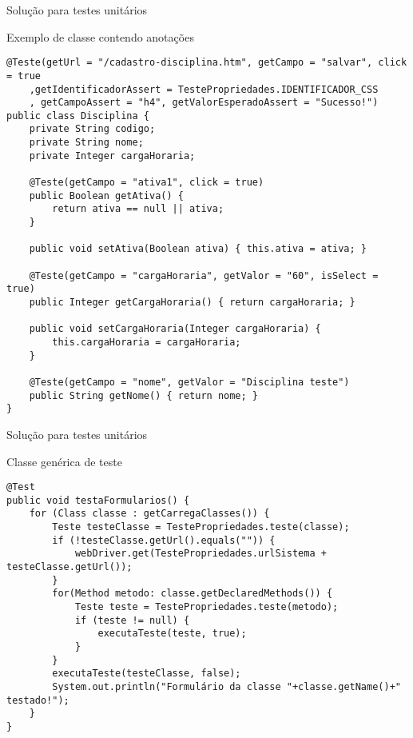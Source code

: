 \documentclass{beamer}
\begin{document}
\begin{frame}[fragile]{Solução para testes unitários}
    \item Exemplo de classe contendo anotações
    \begin{lstlisting}
@Teste(getUrl = "/cadastro-disciplina.htm", getCampo = "salvar", click = true
    ,getIdentificadorAssert = TestePropriedades.IDENTIFICADOR_CSS
    , getCampoAssert = "h4", getValorEsperadoAssert = "Sucesso!")
public class Disciplina {
    private String codigo;
    private String nome;
    private Integer cargaHoraria;

    @Teste(getCampo = "ativa1", click = true)
    public Boolean getAtiva() {
        return ativa == null || ativa;
    }

    public void setAtiva(Boolean ativa) { this.ativa = ativa; }

    @Teste(getCampo = "cargaHoraria", getValor = "60", isSelect = true)
    public Integer getCargaHoraria() { return cargaHoraria; }

    public void setCargaHoraria(Integer cargaHoraria) {
        this.cargaHoraria = cargaHoraria;
    }

    @Teste(getCampo = "nome", getValor = "Disciplina teste")
    public String getNome() { return nome; }
}
	\end{lstlisting}
\end{frame}
\begin{frame}[fragile]{Solução para testes unitários}
    \item Classe genérica de teste
    \begin{lstlisting}
@Test
public void testaFormularios() {
    for (Class classe : getCarregaClasses()) {
        Teste testeClasse = TestePropriedades.teste(classe);
        if (!testeClasse.getUrl().equals("")) {
            webDriver.get(TestePropriedades.urlSistema + testeClasse.getUrl());
        }
        for(Method metodo: classe.getDeclaredMethods()) {
            Teste teste = TestePropriedades.teste(metodo);
            if (teste != null) {
                executaTeste(teste, true);
            }
        }
        executaTeste(testeClasse, false);
        System.out.println("Formulário da classe "+classe.getName()+" testado!");
    }
}
	\end{lstlisting}
\end{frame}
\end{document}
